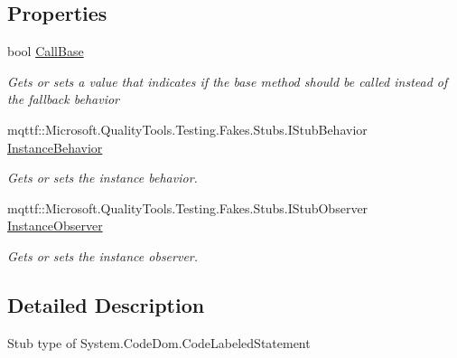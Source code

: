 \subsection*{Properties}
\begin{DoxyCompactItemize}
\item 
bool \hyperlink{class_system_1_1_code_dom_1_1_fakes_1_1_stub_code_labeled_statement_aa2d9ad70ad31e243e60b24e0df76b415}{Call\-Base}
\begin{DoxyCompactList}\small\item\em Gets or sets a value that indicates if the base method should be called instead of the fallback behavior\end{DoxyCompactList}\item 
mqttf\-::\-Microsoft.\-Quality\-Tools.\-Testing.\-Fakes.\-Stubs.\-I\-Stub\-Behavior \hyperlink{class_system_1_1_code_dom_1_1_fakes_1_1_stub_code_labeled_statement_ad86d87b18eff0e0de4b022936bfe6449}{Instance\-Behavior}
\begin{DoxyCompactList}\small\item\em Gets or sets the instance behavior.\end{DoxyCompactList}\item 
mqttf\-::\-Microsoft.\-Quality\-Tools.\-Testing.\-Fakes.\-Stubs.\-I\-Stub\-Observer \hyperlink{class_system_1_1_code_dom_1_1_fakes_1_1_stub_code_labeled_statement_ae26a8fbb1dfe39f0d1d5567f56cf6a16}{Instance\-Observer}
\begin{DoxyCompactList}\small\item\em Gets or sets the instance observer.\end{DoxyCompactList}\end{DoxyCompactItemize}


\subsection{Detailed Description}
Stub type of System.\-Code\-Dom.\-Code\-Labeled\-Statement



